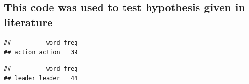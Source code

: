 \documentclass[
]{article}
\newenvironment{Shaded}{\begin{snugshade}}{\end{snugshade}}
\newcommand{\CommentTok}[1]{\textcolor[rgb]{0.56,0.35,0.01}{\textit{#1}}}
\newcommand{\FunctionTok}[1]{\textcolor[rgb]{0.00,0.00,0.00}{#1}}
\newcommand{\NormalTok}[1]{#1}
\newcommand{\SpecialCharTok}[1]{\textcolor[rgb]{0.00,0.00,0.00}{#1}}
\newcommand{\StringTok}[1]{\textcolor[rgb]{0.31,0.60,0.02}{#1}}
\begin{document}
\hypertarget{this-code-was-used-to-test-hypothesis-given-in-literature}{%
\subsection{This code was used to test hypothesis given in
literature}\label{this-code-was-used-to-test-hypothesis-given-in-literature}}

\begin{Shaded}
\end{Shaded}

\begin{verbatim}
##          word freq
## action action   39
\end{verbatim}

\begin{Shaded}
\end{Shaded}

\begin{verbatim}
##          word freq
## leader leader   44
\end{verbatim}
\end{document}

